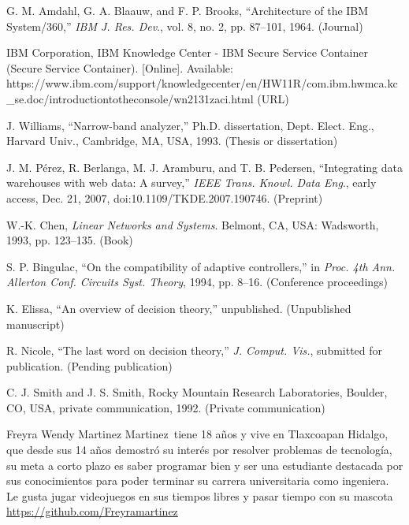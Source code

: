\documentclass{IEEEcsmag}
\begin{document}
\begin{thebibliography}{1}

G. M. Amdahl, G. A. Blaauw, and F. P. Brooks, ``Architecture of the IBM System/360,'' {\it IBM J. Res. Dev}., vol. 8, no. 2, pp. 87--101, 1964. (Journal)

IBM Corporation, IBM Knowledge Center - IBM Secure Service Container (Secure Service Container). [Online]. Available: {https://www.ibm.com/support/\break knowledgecenter/en/HW11R/com.ibm.hwmca.kc\_se.doc/\break introductiontotheconsole/wn2131zaci.html} (URL)

J. Williams, ``Narrow-band analyzer,'' Ph.D. dissertation, Dept.  Elect. Eng., Harvard Univ., Cambridge, MA, USA, 1993. (Thesis or dissertation)

J. M. P\'erez, R. Berlanga, M. J. Aramburu, and T. B. Pedersen, ``Integrating data warehouses with web data: A survey,'' {\it IEEE Trans. Knowl. Data Eng}., early access, Dec. 21, 2007, doi:10.1109/TKDE.2007.190746. (Preprint)

W.-K. Chen, {\it Linear Networks and Systems}. Belmont, CA, USA: Wadsworth,  1993, pp. 123--135. (Book)

S. P. Bingulac, ``On the compatibility of adaptive controllers,'' in {\it Proc. 4th Ann. Allerton Conf. Circuits Syst. Theory}, 1994,  pp. 8--16. (Conference proceedings)

K. Elissa, ``An overview of decision theory,'' unpublished. (Unpublished manuscript)

R. Nicole, ``The last word on decision theory,'' {\it J. Comput. Vis.}, submitted for publication. (Pending publication)

C. J. Smith and J. S. Smith, Rocky Mountain Research Laboratories, Boulder, CO, USA, private communication, 1992. (Private communication)
\end{thebibliography}\vspace*{-8pt}


\begin{IEEEbiography}{Freyra Wendy Martinez Martinez}{\,}
    tiene 18 años y vive en Tlaxcoapan Hidalgo,  que desde sus 14 años demostró su interés por resolver problemas de tecnología,  su meta a corto plazo es saber programar bien y ser una estudiante destacada por sus conocimientos para poder terminar su carrera universitaria como ingeniera.
   Le gusta jugar videojuegos en sus tiempos libres y pasar tiempo con su mascota 
   \url{https://github.com/Freyramartinez}
\end{IEEEbiography}
\end{document}
